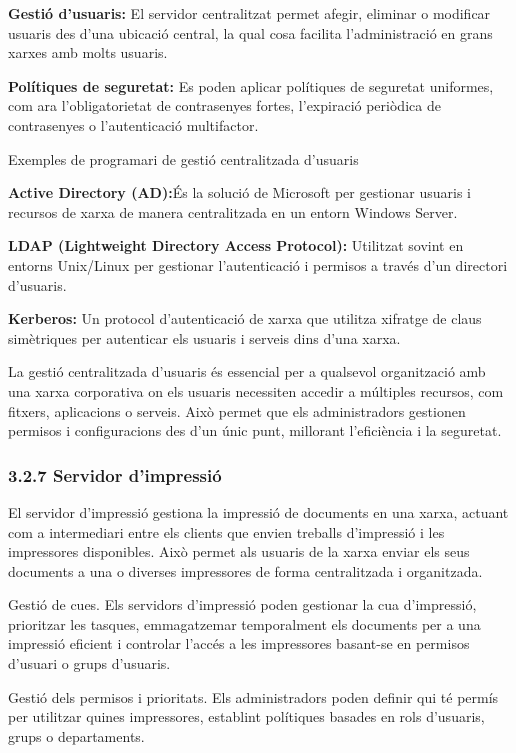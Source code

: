 \documentclass[
  a4paper,
]{article}
\begin{document}
\textbf{Gestió d'usuaris:} El servidor centralitzat permet afegir,
eliminar o modificar usuaris des d'una ubicació central, la qual cosa
facilita l'administració en grans xarxes amb molts usuaris.

\textbf{Polítiques de seguretat:} Es poden aplicar polítiques de
seguretat uniformes, com ara l'obligatorietat de contrasenyes fortes,
l'expiració periòdica de contrasenyes o l'autenticació multifactor.

Exemples de programari de gestió centralitzada d'usuaris

\textbf{Active Directory (AD):}És la solució de Microsoft per gestionar
usuaris i recursos de xarxa de manera centralitzada en un entorn Windows
Server.

\textbf{LDAP (Lightweight Directory Access Protocol):} Utilitzat sovint
en entorns Unix/Linux per gestionar l'autenticació i permisos a través
d'un directori d'usuaris.

\textbf{Kerberos:} Un protocol d'autenticació de xarxa que utilitza
xifratge de claus simètriques per autenticar els usuaris i serveis dins
d'una xarxa.

La gestió centralitzada d'usuaris és essencial per a qualsevol
organització amb una xarxa corporativa on els usuaris necessiten accedir
a múltiples recursos, com fitxers, aplicacions o serveis. Això permet
que els administradors gestionen permisos i configuracions des d'un únic
punt, millorant l'eficiència i la seguretat.

\subsubsection{3.2.7 Servidor d'impressió}\label{servidor-dimpressiuxf3}

El servidor d'impressió gestiona la impressió de documents en una xarxa,
actuant com a intermediari entre els clients que envien treballs
d'impressió i les impressores disponibles. Això permet als usuaris de la
xarxa enviar els seus documents a una o diverses impressores de forma
centralitzada i organitzada.

Gestió de cues. Els servidors d'impressió poden gestionar la cua
d'impressió, prioritzar les tasques, emmagatzemar temporalment els
documents per a una impressió eficient i controlar l'accés a les
impressores basant-se en permisos d'usuari o grups d'usuaris.

Gestió dels permisos i prioritats. Els administradors poden definir qui
té permís per utilitzar quines impressores, establint polítiques basades
en rols d'usuaris, grups o departaments.
\end{document}
